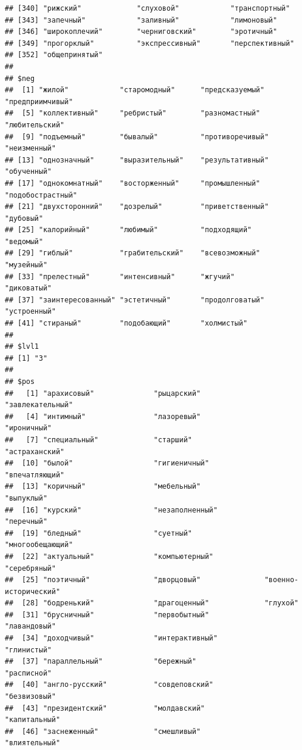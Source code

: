 \documentclass[11pt]{article}\usepackage[]{graphicx}\usepackage[]{color}
\makeatletter
\newenvironment{kframe}{%
 \def\at@end@of@kframe{}%
 \ifinner\ifhmode%
  \def\at@end@of@kframe{\end{minipage}}%
  \begin{minipage}{\columnwidth}%
 \fi\fi%
 \def\FrameCommand##1{\hskip\@totalleftmargin \hskip-\fboxsep
 \colorbox{shadecolor}{##1}\hskip-\fboxsep
     \hskip-\linewidth \hskip-\@totalleftmargin \hskip\columnwidth}%
 \MakeFramed {\advance\hsize-\width
   \@totalleftmargin\z@ \linewidth\hsize
   \@setminipage}}%
 {\par\unskip\endMakeFramed%
 \at@end@of@kframe}
\newenvironment{knitrout}{}{} %
\makeatother
\begin{document}
\begin{knitrout}
\begin{kframe}
\begin{verbatim}
## [340] "рижский"             "слуховой"            "транспортный"       
## [343] "запечный"            "заливный"            "лимоновый"          
## [346] "широкоплечий"        "черниговский"        "эротичный"          
## [349] "прогорклый"          "экспрессивный"       "перспективный"      
## [352] "общепринятый"       
## 
## $neg
##  [1] "жилой"            "старомодный"      "предсказуемый"    "предприимчивый"  
##  [5] "коллективный"     "ребристый"        "разномастный"     "любительский"    
##  [9] "подъемный"        "бывалый"          "противоречивый"   "неизменный"      
## [13] "однозначный"      "выразительный"    "результативный"   "обученный"       
## [17] "однокомнатный"    "восторженный"     "промышленный"     "подобострастный" 
## [21] "двухсторонний"    "дозрелый"         "приветственный"   "дубовый"         
## [25] "калорийный"       "любимый"          "подходящий"       "ведомый"         
## [29] "гиблый"           "грабительский"    "всевозможный"     "музейный"        
## [33] "прелестный"       "интенсивный"      "жгучий"           "диковатый"       
## [37] "заинтересованный" "эстетичный"       "продолговатый"    "устроенный"      
## [41] "стираный"         "подобающий"       "холмистый"       
## 
## $lvl1
## [1] "3"
## 
## $pos
##   [1] "арахисовый"              "рыцарский"               "завлекательный"         
##   [4] "интимный"                "лазоревый"               "ироничный"              
##   [7] "специальный"             "старший"                 "астраханский"           
##  [10] "былой"                   "гигиеничный"             "впечатляющий"           
##  [13] "коричный"                "мебельный"               "выпуклый"               
##  [16] "курский"                 "незаполненный"           "перечный"               
##  [19] "бледный"                 "суетный"                 "многообещающий"         
##  [22] "актуальный"              "компьютерный"            "серебряный"             
##  [25] "поэтичный"               "дворцовый"               "военно-исторический"    
##  [28] "бодренький"              "драгоценный"             "глухой"                 
##  [31] "брусничный"              "первобытный"             "лавандовый"             
##  [34] "доходчивый"              "интерактивный"           "глинистый"              
##  [37] "параллельный"            "бережный"                "расписной"              
##  [40] "англо-русский"           "совдеповский"            "безвизовый"             
##  [43] "президентский"           "молдавский"              "капитальный"            
##  [46] "заснеженный"             "смешливый"               "влиятельный"            

\end{verbatim}
\end{kframe}
\end{knitrout}
\end{document}
